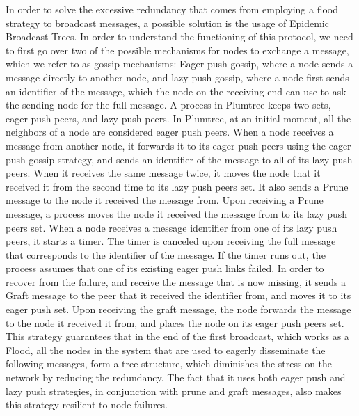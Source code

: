 \documentclass[sigconf]{acmart}
\begin{document}
In order to solve the excessive redundancy that comes from employing a flood strategy to broadcast messages, a possible solution is the usage of Epidemic Broadcast Trees.
In order to understand the functioning of this protocol, we need to first go over two of the possible mechanisms for nodes to exchange a message, which we refer to as gossip mechanisms:
Eager push gossip, where a node sends a message directly to another node, and lazy push gossip, where a node first sends an identifier of the message, which the node on the receiving end can use to ask the sending node for the full message.
A process in Plumtree keeps two sets, eager push peers, and lazy push peers.
In Plumtree, at an initial moment, all the neighbors of a node are considered eager push peers. When a node receives a message from another node, it forwards it to its eager push peers using the eager push gossip strategy, and sends an identifier of the message to all of its lazy push peers. When it receives the same message twice, it moves the node that it received it from the second time to its lazy push peers set. It also sends a Prune message to the node it received the message from. Upon receiving a Prune message, a process moves the node it received the message from to its lazy push peers set.
When a node receives a message identifier from one of its lazy push peers, it starts a timer. The timer is canceled upon receiving the full message that corresponds to the identifier of the message. If the timer runs out, the process assumes that one of its existing eager push links failed. In order to recover from the failure, and receive the message that is now missing, it sends a Graft message to the peer that it received the identifier from, and moves it to its eager push set. Upon receiving the graft message, the node forwards the message to the node it received it from, and places the node on its eager push peers set.
This strategy guarantees that in the end of the first broadcast, which works as a Flood, all the nodes in the system that are used to eagerly disseminate the following messages, form a tree structure, which diminishes the stress on the network by reducing the redundancy.
The fact that it uses both eager push and lazy push strategies, in conjunction with prune and graft messages, also makes this strategy resilient to node failures.

\end{document}
